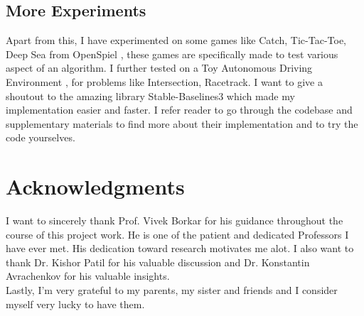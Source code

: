 \documentclass{article}
\theoremstyle{definition}
\begin{document}
\subsection{More Experiments}
Apart from this, I have experimented on some games like Catch, Tic-Tac-Toe, Deep Sea from OpenSpiel \cite{openspiel}, these games are specifically made to test various aspect of an algorithm. I further tested on a Toy Autonomous Driving Environment \cite{highway-env}, for problems like Intersection, Racetrack. I want to give a shoutout to the amazing library Stable-Baselines3 \cite{stable-baselines3} which made my implementation easier and faster. I refer reader to go through the codebase and supplementary materials to find more about their implementation and to try the code yourselves.

\section{Acknowledgments}
I want to sincerely thank Prof. Vivek Borkar for his guidance throughout the course of this project work. He is one of the patient and dedicated Professors I have ever met. His dedication toward research motivates me alot. I also want to thank Dr. Kishor Patil for his valuable discussion and Dr. Konstantin Avrachenkov for his valuable insights.\\
Lastly, I'm very grateful to my parents, my sister and friends and I consider myself very lucky to have them. 
\end{document}

